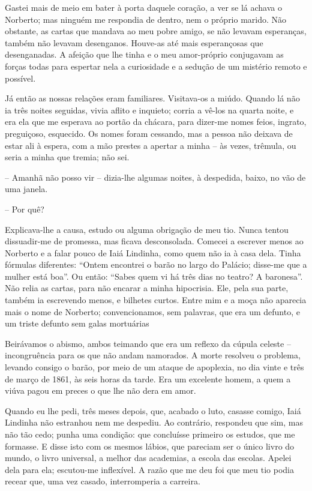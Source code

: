 Gastei mais de meio em bater à porta daquele coração, a ver se lá achava
o Norberto; mas ninguém me respondia de dentro, nem o próprio marido.
Não obstante, as cartas que mandava ao meu pobre amigo, se não levavam
esperanças, também não levavam desenganos. Houve-as até mais
esperançosas que desenganadas. A afeição que lhe tinha e o meu
amor-próprio conjugavam as forças todas para espertar nela a curiosidade
e a sedução de um mistério remoto e possível.

Já então as nossas relações eram familiares. Visitava-os a miúdo. Quando
lá não ia três noites seguidas, vivia aflito e inquieto; corria a vê-los
na quarta noite, e era ela que me esperava ao portão da chácara, para
dizer-me nomes feios, ingrato, preguiçoso, esquecido. Os nomes foram
cessando, mas a pessoa não deixava de estar ali à espera, com a mão
prestes a apertar a minha -- às vezes, trêmula, ou seria a minha que
tremia; não sei.

-- Amanhã não posso vir -- dizia-lhe algumas noites, à despedida, baixo,
no vão de uma janela.

-- Por quê?

Explicava-lhe a causa, estudo ou alguma obrigação de meu tio. Nunca
tentou dissuadir-me de promessa, mas ficava desconsolada. Comecei a
escrever menos ao Norberto e a falar pouco de Iaiá Lindinha, como quem
não ia à casa dela. Tinha fórmulas diferentes: ``Ontem encontrei o barão
no largo do Palácio; disse-me que a mulher está boa''. Ou então: ``Sabes
quem vi há três dias no teatro? A baronesa''. Não relia as cartas, para
não encarar a minha hipocrisia. Ele, pela sua parte, também ia
escrevendo menos, e bilhetes curtos. Entre mim e a moça não aparecia
mais o nome de Norberto; convencionamos, sem palavras, que era um
defunto, e um triste defunto sem galas mortuárias

Beirávamos o abismo, ambos teimando que era um reflexo da cúpula celeste
-- incongruência para os que não andam namorados. A morte resolveu o
problema, levando consigo o barão, por meio de um ataque de apoplexia,
no dia vinte e três de março de 1861, às seis horas da tarde. Era um
excelente homem, a quem a viúva pagou em preces o que lhe não dera em
amor.

Quando eu lhe pedi, três meses depois, que, acabado o luto, casasse
comigo, Iaiá Lindinha não estranhou nem me despediu. Ao contrário,
respondeu que sim, mas não tão cedo; punha uma condição: que concluísse
primeiro os estudos, que me formasse. E disse isto com os mesmos lábios,
que pareciam ser o único livro do mundo, o livro universal, a melhor das
academias, a escola das escolas. Apelei dela para ela; escutou-me
inflexível. A razão que me deu foi que meu tio podia recear que, uma vez
casado, interromperia a carreira.

